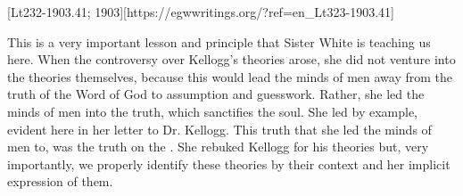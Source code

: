 [Lt232-1903.41; 1903][https://egwwritings.org/?ref=en\_Lt323-1903.41]

This is a very important lesson and principle that Sister White is teaching us here. When the controversy over Kellogg’s theories arose, she did not venture into the theories themselves, because this would lead the minds of men away from the truth of the Word of God to assumption and guesswork. Rather, she led the minds of men into the truth, which sanctifies the soul. She led by example, evident here in her letter to Dr. Kellogg. This truth that she led the minds of men to, was the truth on the . She rebuked Kellogg for his theories but, very importantly, we properly identify these theories by their context and her implicit expression of them. 

